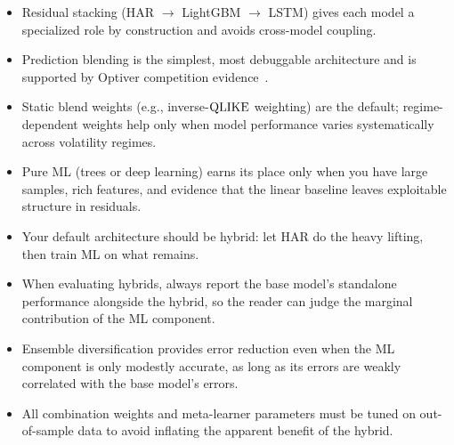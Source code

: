 \begin{itemize}
        backpropagate into the LSTM, so the embedding is never optimized
        for the tree's objective.
  \item Residual stacking (HAR $\to$ LightGBM $\to$ LSTM) gives each
        model a specialized role by construction and avoids
        cross-model coupling.
  \item Prediction blending is the simplest, most debuggable architecture
        and is supported by Optiver competition
        evidence~\citep{Optiver2021}.
  \item Static blend weights (e.g., inverse-$\operatorname{QLIKE}$ weighting) are the
        default; regime-dependent weights help only when model performance
        varies systematically across volatility regimes.
  \item Pure ML (trees or deep learning) earns its place only when you
        have large samples, rich features, and evidence that the linear
        baseline leaves exploitable structure in residuals.
  \item Your default architecture should be hybrid: let HAR do the heavy
        lifting, then train ML on what remains.
  \item When evaluating hybrids, always report the base model's
        standalone performance alongside the hybrid, so the reader can
        judge the marginal contribution of the ML component.
  \item Ensemble diversification provides error reduction even when the ML
        component is only modestly accurate, as long as its errors are
        weakly correlated with the base model's errors.
  \item All combination weights and meta-learner parameters must be tuned
        on out-of-sample data to avoid inflating the apparent benefit of
        the hybrid.
\end{itemize}


